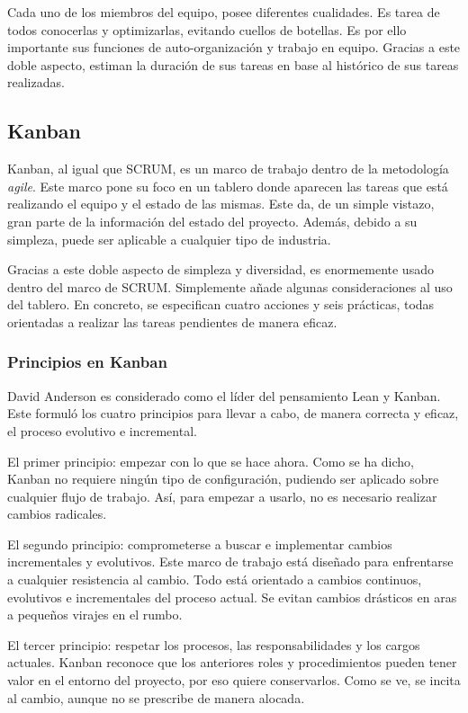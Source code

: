 Cada uno de los miembros del equipo, posee diferentes cualidades. Es tarea de todos conocerlas y optimizarlas, evitando cuellos de botellas. Es por ello importante sus funciones de auto-organización y trabajo en equipo. Gracias a este doble aspecto, estiman la duración de sus tareas en base al histórico de sus tareas realizadas.

\subsection{Kanban}
Kanban, al igual que SCRUM, es un marco de trabajo dentro de la metodología \textit{agile}. Este marco pone su foco en un tablero donde aparecen las tareas que está realizando el equipo y el estado de las mismas. Este da, de un simple vistazo, gran parte de la información del estado del proyecto. Además, debido a su simpleza, puede ser aplicable a cualquier tipo de industria.


Gracias a este doble aspecto de simpleza y diversidad, es enormemente usado dentro del marco de SCRUM. Simplemente añade algunas consideraciones al uso del tablero. En concreto, se especifican cuatro acciones y seis prácticas, todas orientadas a realizar las tareas pendientes de manera eficaz.

\subsubsection{Principios en Kanban}
David Anderson es considerado como el líder del pensamiento Lean y Kanban. Este formuló los cuatro principios para llevar a cabo, de manera correcta y eficaz, el proceso evolutivo e incremental.

El primer principio: empezar con lo que se hace ahora. Como se ha dicho, Kanban no requiere ningún tipo de configuración, pudiendo ser aplicado sobre cualquier flujo de trabajo. Así, para empezar a usarlo, no es necesario realizar cambios radicales.

El segundo principio: comprometerse a buscar e implementar cambios incrementales y evolutivos. Este marco de trabajo está diseñado para enfrentarse a cualquier resistencia al cambio. Todo está orientado a cambios continuos, evolutivos e incrementales del proceso actual. Se evitan cambios drásticos en aras a pequeños virajes en el rumbo.

El tercer principio: respetar los procesos, las responsabilidades y los cargos actuales. Kanban reconoce que los anteriores roles y procedimientos pueden tener valor en el entorno del proyecto, por eso quiere conservarlos. Como se ve, se incita al cambio, aunque no se prescribe de manera alocada.


